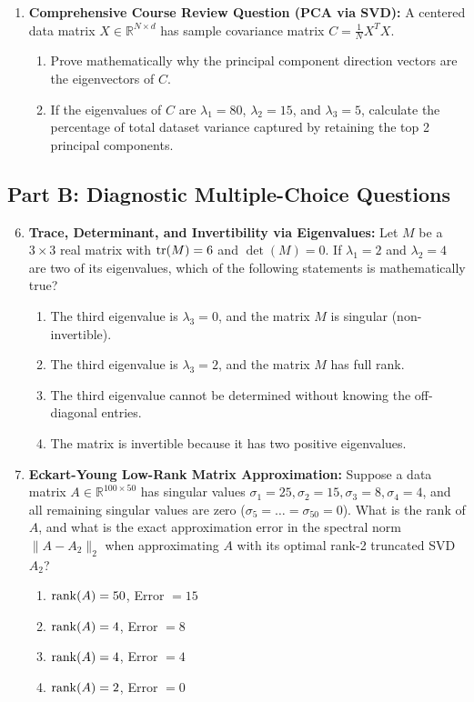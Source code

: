 \begin{enumerate}
\item \textbf{Comprehensive Course Review Question (PCA via SVD):} A centered data matrix $X \in \mathbb{R}^{N \times d}$ has sample covariance matrix $C = \frac{1}{N} X^T X$.
\begin{enumerate}
    \item Prove mathematically why the principal component direction vectors are the eigenvectors of $C$.
    \item If the eigenvalues of $C$ are $\lambda_1 = 80$, $\lambda_2 = 15$, and $\lambda_3 = 5$, calculate the percentage of total dataset variance captured by retaining the top 2 principal components.
\end{enumerate}
\end{enumerate}

\subsection*{Part B: Diagnostic Multiple-Choice Questions}
\begin{enumerate}
\setcounter{enumi}{5}
\item \textbf{Trace, Determinant, and Invertibility via Eigenvalues:} Let $M$ be a $3 \times 3$ real matrix with $\operatorname{tr}(M) = 6$ and $\det(M) = 0$. If $\lambda_1 = 2$ and $\lambda_2 = 4$ are two of its eigenvalues, which of the following statements is mathematically true?
\begin{enumerate}
    \item The third eigenvalue is $\lambda_3 = 0$, and the matrix $M$ is singular (non-invertible).
    \item The third eigenvalue is $\lambda_3 = 2$, and the matrix $M$ has full rank.
    \item The third eigenvalue cannot be determined without knowing the off-diagonal entries.
    \item The matrix is invertible because it has two positive eigenvalues.
\end{enumerate}

\item \textbf{Eckart-Young Low-Rank Matrix Approximation:} Suppose a data matrix $A \in \mathbb{R}^{100 \times 50}$ has singular values $\sigma_1 = 25, \sigma_2 = 15, \sigma_3 = 8, \sigma_4 = 4$, and all remaining singular values are zero ($\sigma_5 = \dots = \sigma_{50} = 0$). What is the rank of $A$, and what is the exact approximation error in the spectral norm $\|A - A_2\|_2$ when approximating $A$ with its optimal rank-2 truncated SVD $A_2$?
\begin{enumerate}
    \item $\operatorname{rank}(A) = 50$, Error $= 15$
    \item $\operatorname{rank}(A) = 4$, Error $= 8$
    \item $\operatorname{rank}(A) = 4$, Error $= 4$
    \item $\operatorname{rank}(A) = 2$, Error $= 0$
\end{enumerate}
\end{enumerate}
